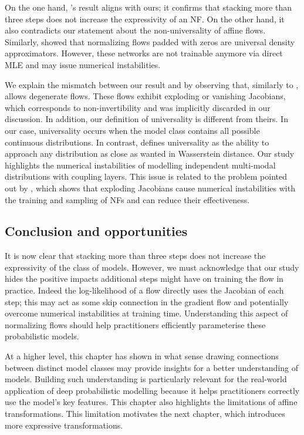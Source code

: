 On the one hand, \citet{koehler2021representational}'s result aligns with ours; it confirms that stacking more than three steps does not increase the expressivity of an NF.
On the other hand, it also contradicts our statement about the non-universality of affine flows. Similarly, \citet{huang2020augmented} showed that normalizing flows padded with zeros are universal density approximators. However, these networks are not trainable anymore via direct MLE and may issue numerical instabilities.

We explain the mismatch between our result and \citet{koehler2021representational} by observing that, similarly to \citet{huang2020augmented}, \citet{koehler2021representational} allows degenerate flows. These flows exhibit exploding or vanishing Jacobians, which corresponds to non-invertibility and was implicitly discarded in our discussion. In addition, our definition of universality is different from theirs. In our case, universality occurs when the model class contains all possible continuous distributions. In contrast, \citet{koehler2021representational} defines universality as the ability to approach any distribution as close as wanted in Wasserstein distance. Our study highlights the numerical instabilities of modelling independent multi-modal distributions with coupling layers. This issue is related to the problem pointed out by \citet{behrmann2021understanding}, which shows that exploding Jacobians cause numerical instabilities with the training and sampling of NFs and can reduce their effectiveness.

\subsection{Conclusion and opportunities}
It is now clear that stacking more than three steps does not increase the expressivity of the class of models. However, we must acknowledge that our study hides the positive impacts additional steps might have on training the flow in practice. Indeed the log-likelihood of a flow directly uses the Jacobian of each step; this may act as some skip connection in the gradient flow and potentially overcome numerical instabilities at training time. Understanding this aspect of normalizing flows should help practitioners efficiently parameterise these probabilistic models.

At a higher level, this chapter has shown in what sense drawing connections between distinct model classes may provide insights for a better understanding of models. Building such understanding is particularly relevant for the real-world application of deep probabilistic modelling because it helps practitioners correctly use the model's key features. This chapter also highlights the limitations of affine transformations. This limitation motivates the next chapter, which introduces more expressive transformations.
%
